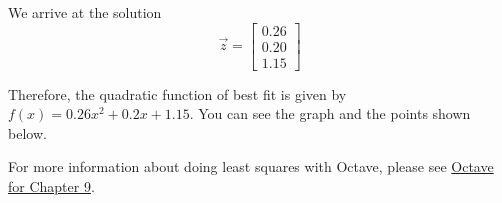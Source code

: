 \documentclass{ximera}
\begin{document}
\begin{example}
\begin{explanation}
    
    We arrive at the solution
    $$\vec{z}=\begin{bmatrix}0.26\\0.20\\1.15\end{bmatrix}$$

    Therefore, the quadratic function of best fit is given by $f(x)=0.26x^2+0.2x+1.15$.  You can see the graph and the points shown below.

\begin{onlineOnly}
\begin{center}
\end{center}
\end{onlineOnly}

\end{explanation}
 \end{example}

 For more information about doing least squares with Octave, please see \href{https://ximera.osu.edu/linearalgebradzv3/xOctave/OCT_orth/main}{Octave for Chapter 9}.
\end{document}
